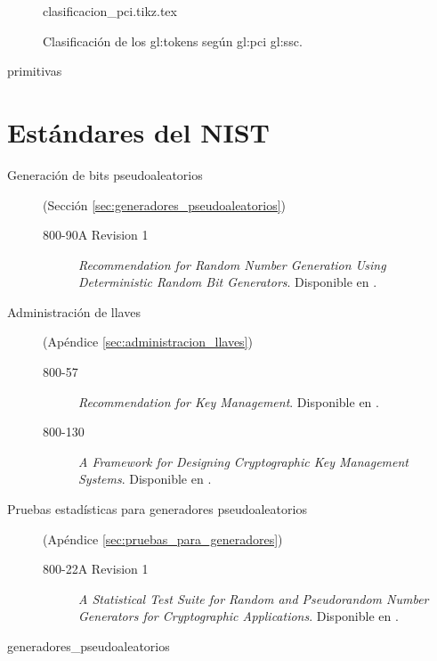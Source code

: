 \begin{figure}[h]
  \begin{center}
    {clasificacion_pci.tikz.tex}
    \caption{Clasificación de los \glspl{gl:token}
      según \gls{gl:pci} \gls{gl:ssc}.}
    \label{fig:division_tokens}
  \end{center}
\end{figure}

{primitivas}

\section{Estándares del NIST}

\begin{description}


  \item[Generación de bits pseudoaleatorios] (Sección
    \ref{sec:generadores_pseudoaleatorios})
    \begin{description}
      \item[800-90A Revision 1] \textit{Recommendation for Random Number
        Generation Using Deterministic Random Bit Generators}. Disponible en
        \cite{nist_aleatorios}.
    \end{description}

  \item[Administración de llaves] (Apéndice \ref{sec:administracion_llaves})
    \begin{description}
      \item[800-57] \textit{Recommendation for Key Management}. Disponible en
        \cite{nist_llaves}.
      \item[800-130] \textit{A Framework for Designing Cryptographic Key
        Management Systems}. Disponible en \cite{nist_disenio_llaves}.
    \end{description}

  \item[Pruebas estadísticas para generadores pseudoaleatorios] (Apéndice
    \ref{sec:pruebas_para_generadores})
    \begin{description}
      \item[800-22A Revision 1] \textit{A Statistical Test Suite for Random and
        Pseudorandom Number Generators for Cryptographic Applications}.
        Disponible en \cite{nist_pruebas}.
    \end{description}
\end{description}



{generadores_pseudoaleatorios}
